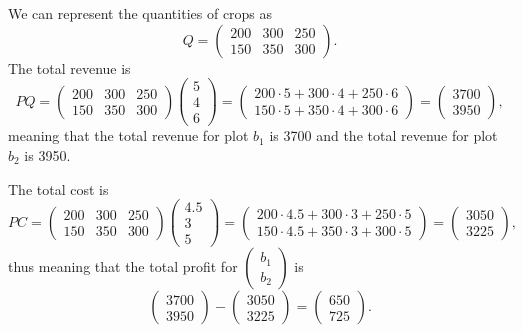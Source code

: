\documentclass[a4paper, 12pt,oneside,openany]{book}
\begin{document}
We can represent the quantities of crops as $$Q=\begin{pmatrix} 200&300&250 \\ 150&350&300\end{pmatrix}.$$ The total revenue is $$PQ = \begin{pmatrix} 200&300&250 \\ 150&350&300\end{pmatrix} \begin{pmatrix} 5\\4\\6 \end{pmatrix}= \begin{pmatrix} 200\cdot5+300\cdot 4+250\cdot 6 \\ 150\cdot5+350\cdot 4 + 300\cdot 6 \end{pmatrix} = \begin{pmatrix} 3700 \\ 3950 \end{pmatrix},$$ meaning that the total revenue for plot $b_1$ is 3700 and the total revenue for plot $b_2$ is 3950. 

The total cost is $$PC = \begin{pmatrix} 200&300&250 \\ 150&350&300\end{pmatrix} \begin{pmatrix} 4.5\\3\\5 \end{pmatrix}= \begin{pmatrix} 200\cdot4.5+300\cdot 3+250\cdot 5 \\ 150\cdot4.5+350\cdot 3 + 300\cdot 5 \end{pmatrix} = \begin{pmatrix} 3050 \\ 3225 \end{pmatrix},$$ thus meaning that the total profit for $\begin{pmatrix} b_1 \\ b_2 \end{pmatrix}$ is $$\begin{pmatrix} 3700 \\ 3950 \end{pmatrix}-\begin{pmatrix} 3050 \\ 3225 \end{pmatrix}= \begin{pmatrix} 650 \\ 725 \end{pmatrix}.$$ 
\end{document}
